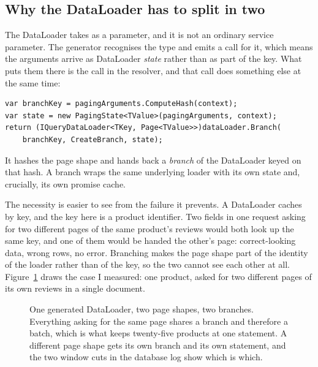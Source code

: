 \subsection*{Why the DataLoader has to split in two}

%
The DataLoader takes  as a parameter, and it is not an
ordinary service parameter. The generator recognises the type and emits a
 call for it, which means the arguments arrive as
DataLoader \emph{state} rather than as part of the key. What puts them there is
the  call in the resolver, and that call does something else at the
same time:

\begin{verbatim}
var branchKey = pagingArguments.ComputeHash(context);
var state = new PagingState<TValue>(pagingArguments, context);
return (IQueryDataLoader<TKey, Page<TValue>>)dataLoader.Branch(
    branchKey, CreateBranch, state);
\end{verbatim}

It hashes the page shape and hands back a \emph{branch} of the DataLoader keyed
on that hash. A branch wraps the same underlying loader with its own state and,
crucially, its own promise cache.

%
The necessity is easier to see from the failure it prevents. A DataLoader caches
by key, and the key here is a product identifier. Two fields in one request
asking for two different pages of the same product's reviews would both look up
the same key, and one of them would be handed the other's page: correct-looking
data, wrong rows, no error. Branching makes the page shape part of the identity
of the loader rather than of the key, so the two cannot see each other at all.
Figure~\ref{fig:ch05-branching} draws the case I measured: one product, asked
for two different pages of its own reviews in a single document.

\begin{figure}[htbp]
  \centering
  
  \caption{One generated DataLoader, two page shapes, two branches. Everything
  asking for the same page shares a branch and therefore a batch, which is what
  keeps twenty-five products at one statement. A different page shape gets its
  own branch and its own statement, and the two window cuts in the database log
  show which is which.}
  \label{fig:ch05-branching}
\end{figure}

